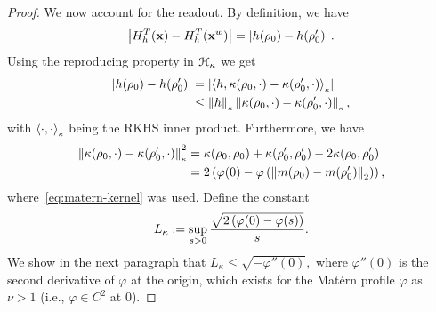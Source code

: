 \begin{proof}
   We now account for the readout. By definition, we have
$$\left| H^T_h({\mathbf{x}}) - H^T_h({\mathbf{x}}^w) \right|  = \left| h(\rho_0) - h(\rho'_0) \right|.$$
Using the reproducing property in ${\mathcal{H}}_{\kappa}$ we get
\begin{equation}\label{eq:reprod-rho-0}
\begin{aligned}
    \left| h(\rho_0) - h(\rho_0') \right| &= \left| \Braket{h, \kappa(\rho_0, \cdot) - \kappa(\rho_0', \cdot)}_{\scriptscriptstyle \kappa} \right|\\
    &\leq \left\lVert h\right\rVert_{\scriptscriptstyle \kappa} \left\lVert\kappa(\rho_0, \cdot) - \kappa(\rho_0', \cdot)\right\rVert_{\scriptscriptstyle \kappa},
\end{aligned}
\end{equation}
with $\Braket{\cdot, \cdot}_{\scriptscriptstyle \kappa}$ being the RKHS inner product. Furthermore, we have
\begin{equation}\label{eq:kernel-to-matern-profile}
\begin{aligned}
    \left\lVert\kappa(\rho_0, \cdot) - \kappa(\rho_0', \cdot)\right\rVert_{\scriptscriptstyle \kappa}^2 &= \kappa(\rho_0,\rho_0) + \kappa(\rho'_0,\rho'_0) - 2 \kappa(\rho_0,\rho'_0)\\
    &= 2 \left(\varphi(0) - \varphi\left(\left\lVert m(\rho_0) - m(\rho'_0)\right\rVert_{2}\right)\right),
\end{aligned}
\end{equation}
where~\cref{eq:matern-kernel} was used. Define the constant
$$
L_\kappa := \sup_{s > 0} \frac{\sqrt{2 \left(\varphi(0) - \varphi(s)\right)}}{s}.
$$
We show in the next paragraph that $L_\kappa \leq \sqrt{-\varphi''(0)},$ where $\varphi''(0)$ is the second derivative of $\varphi$ at the origin, which exists for the Mat\'ern profile $\varphi$ as $\nu > 1$ (i.e., $\varphi \in C^2$ at $0$).


\end{proof}
